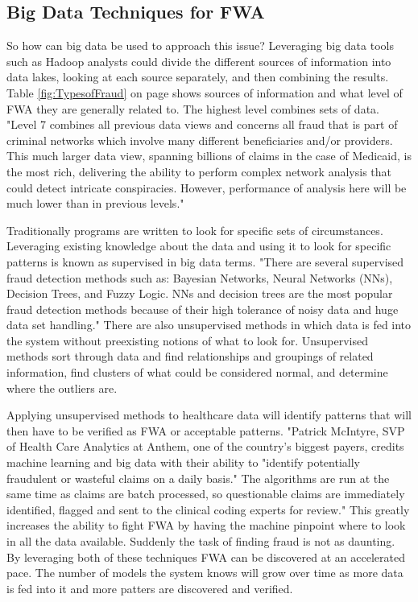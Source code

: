 \documentclass[sigconf]{acmart}
\begin{document}
\subsection{Big Data Techniques for FWA}

So how can big data be used to approach this issue?  Leveraging big data tools such as 
Hadoop analysts could divide the different sources of information into data lakes, 
looking at each source separately, and then combining the results.  Table 
\ref{fig:TypesofFraud} on page \pageref{fig:TypesofFraud} shows sources of information 
and what level of FWA they are generally related to.  The highest level combines sets 
of data.  "Level 7 combines all previous data views and concerns all fraud that is part 
of criminal networks which involve many different beneficiaries and/or providers. This 
much larger data view, spanning billions of claims in the case of Medicaid, is the most 
rich, delivering the ability to perform complex network analysis that could detect 
intricate conspiracies. However, performance of analysis here will be much lower than 
in previous levels."\cite{THORNTON20131252} 

Traditionally programs are written to look for specific sets of circumstances.  
Leveraging existing knowledge about the data and using it to look for specific patterns 
is known as supervised in big data terms.  "There are several supervised fraud detection methods such as: Bayesian Networks, Neural Networks (NNs), Decision Trees, and Fuzzy Logic. NNs and decision trees are the most popular fraud detection methods because of their high tolerance of noisy data and huge data set handling."  There are also unsupervised methods in which data is fed into the system without preexisting notions of what to look for\cite{Ghuse}.  Unsupervised methods sort through data and find relationships and groupings of related information, find clusters of what could be considered normal, and determine where the outliers are.  

Applying unsupervised methods to healthcare data will identify patterns that will then have to be verified as FWA or acceptable patterns.  "Patrick McIntyre, SVP of Health Care Analytics at Anthem, one of the country's biggest payers, credits machine learning and big data with their ability to "identify potentially fraudulent or wasteful claims on a daily basis." The algorithms are run at the same time as claims are batch processed, so questionable claims are immediately identified, flagged and sent to the clinical coding experts for review."\cite{Datameer}  This greatly increases the ability to fight FWA by having the machine pinpoint where to look in all the data available.  Suddenly the task of finding fraud is not as daunting.  By leveraging both of these techniques FWA can be discovered at an accelerated pace.  The number of models the system knows will grow over time as more data is fed into it and more patters are discovered and verified.
\end{document}
